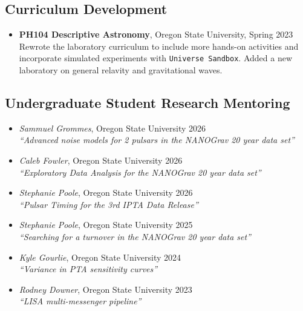 \documentclass[11pt,letterpaper,sans,unicode]{moderncv}
\newcommand{\studentitem}[4]{\item \textit{#1}, {#2} \hfill{#3} \\ \textit{``#4''} } %
\newcommand{\blucirc}{{\color{color1} $\circ\;\;$}}
\begin{document}
{\subsection{Curriculum Development}
	\renewcommand\labelitemi{\blucirc}
	\begin{itemize}[leftmargin=8mm]
	\setlength\itemsep{1mm}
	\item \textbf{\color{color1} PH104 Descriptive Astronomy}, Oregon State University, \hfill Spring 2023
        		\newline  Rewrote the laboratory curriculum to include more hands-on activities
				\newline and incorporate simulated experiments with \texttt{Universe Sandbox}.
				\newline Added a new laboratory on general relavity and gravitational waves.
	\end{itemize}





\subsection{Undergraduate Student Research Mentoring}
\renewcommand\labelitemi{\blucirc}
\begin{itemize}[leftmargin=8mm]
	\studentitem{Sammuel Grommes}{Oregon State University}{2026}{Advanced noise models for 2 pulsars in the NANOGrav 20 year data set}
	\studentitem{Caleb Fowler}{Oregon State University}{2026}{Exploratory Data Analysis for the NANOGrav 20 year data set}
	\studentitem{Stephanie Poole}{Oregon State University}{2026}{Pulsar Timing for the 3rd IPTA Data Release}
	\studentitem{Stephanie Poole}{Oregon State University}{2025}{Searching for a turnover in the NANOGrav 20 year data set}
	\studentitem{Kyle Gourlie}{Oregon State University}{2024}{Variance in PTA sensitivity curves}
	\studentitem{Rodney Downer}{Oregon State University}{2023}{LISA multi-messenger pipeline}
\end{itemize}

}
\end{document}
